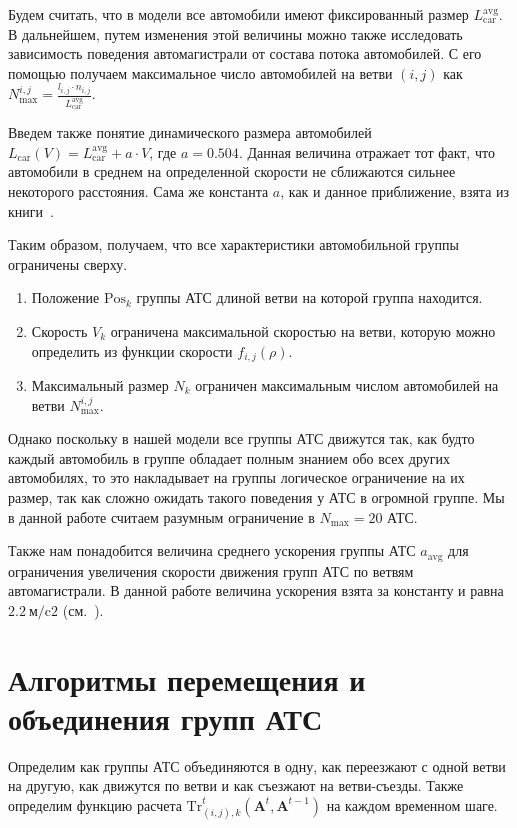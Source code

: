 Будем считать, что в модели все автомобили имеют фиксированный размер $L_\text{car}^\text{avg}$.
В дальнейшем, путем изменения этой величины можно также исследовать зависимость поведения автомагистрали от состава потока автомобилей.
С его помощью получаем максимальное число автомобилей на ветви $(i,j)$ как $N^{i,j}_\text{max} = \frac{l_{i,j} \cdot n_{i, j}}{L_\text{car}^\text{avg}}$.

Введем также понятие динамического размера автомобилей $L_\text{car}(V) = L_\text{car}^\text{avg} + a\cdot V$, где $a = 0.504$. Данная величина отражает тот факт, что автомобили в среднем на определенной скорости не сближаются сильнее некоторого расстояния. Сама же константа $a$, как и данное приближение, взята из книги~\cite{art/Gasnikov}.

Таким образом, получаем, что все характеристики автомобильной группы ограничены сверху.
\begin{enumerate}
  \item Положение $\mathrm{Pos}_k$ группы АТС длиной ветви на которой группа находится.
  \item Скорость $V_k$ ограничена максимальной скоростью на ветви, которую можно определить из функции скорости $f_{i,j}(\rho)$.
  \item Максимальный размер $N_k$ ограничен максимальным числом автомобилей на ветви $N^{i,j}_\text{max}$.
\end{enumerate}

Однако поскольку в нашей модели все группы АТС движутся так, как будто каждый автомобиль в группе обладает полным знанием обо всех других автомобилях, то это накладывает на группы логическое ограничение на их размер, так как сложно ожидать такого поведения у АТС в огромной группе. Мы в данной работе считаем разумным ограничение в $N_\text{max} = 20$ АТС.

Также нам понадобится величина среднего ускорения группы АТС $a_\text{avg}$ для ограничения увеличения скорости движения групп АТС по ветвям автомагистрали. В данной работе величина ускорения взята за константу и равна $2.2\ \text{м/c2}$ (см.~\cite{long2000acceleration}).


\section{Алгоритмы перемещения и объединения групп АТС}
\label{sec:calc_functions}
Определим как группы АТС объединяются в одну, как переезжают с одной ветви на другую, как движутся по ветви и как съезжают на ветви-съезды.
Также определим функцию расчета $\text{Tr}_{(i, j), k}^t (\mathbf{A}^t, \mathbf{A}^{t-1})$ на каждом временном шаге.

